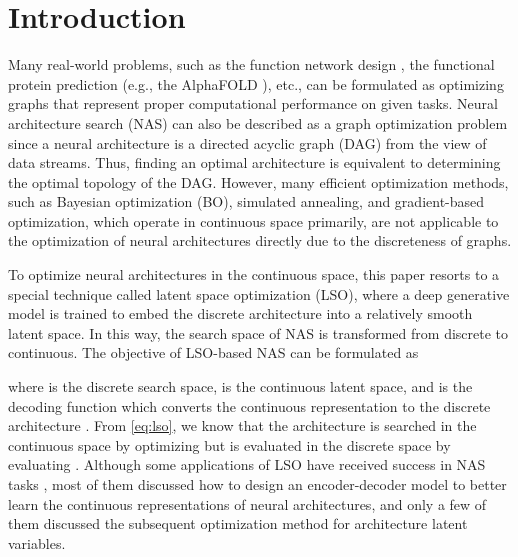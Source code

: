 \documentclass[10pt,twocolumn,letterpaper]{article}
\begin{document}
\section{Introduction}
\label{sec:intro}
Many real-world problems, such as the function network design \cite{DBLP:conf/nips/AstudilloF21}, the functional protein prediction (e.g., the AlphaFOLD \cite{jumper2021highly}), etc., can be formulated as optimizing graphs that represent proper computational performance on given tasks. Neural architecture search (NAS) can also be described as a graph optimization problem since a neural architecture is a directed acyclic graph (DAG) from the view of data streams. Thus, finding an optimal architecture is equivalent to determining the optimal topology of the DAG. However, many efficient optimization methods, such as Bayesian optimization (BO), simulated annealing, and gradient-based optimization, which operate in continuous space primarily, are not applicable to the optimization of neural architectures directly due to the discreteness of graphs.

To optimize neural architectures in the continuous space, this paper resorts to a special technique called latent space optimization (LSO), where a deep generative model is trained to embed the discrete architecture into a relatively smooth latent space. In this way, the search space of NAS is transformed from discrete to continuous. The objective of LSO-based NAS can be formulated as  

where  is the discrete search space,  is the continuous latent space, and  is the decoding function which converts the continuous representation  to the discrete architecture . From \eqref{eq:lso}, we know that the architecture is searched in the continuous space  by optimizing  but is evaluated in the discrete space  by evaluating . Although some applications of LSO have received success in NAS tasks \cite{luo2018neural, DBLP:conf/nips/ZhangJCGC19, chatzianastasis2021graph}, most of them discussed how to design an encoder-decoder model to better learn the continuous representations of neural architectures, and only a few of them discussed the subsequent optimization method for architecture latent variables. 
\end{document}
